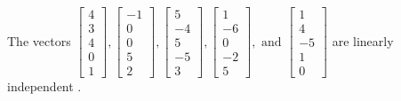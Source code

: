 \begin{exercise}
\begin{exerciseStatement}
  \end{exerciseStatement}
  \begin{exerciseAnswer}
   The vectors \(\left[\begin{array}{r}
4 \\
3 \\
4 \\
0 \\
1
\end{array}\right] , \left[\begin{array}{r}
-1 \\
0 \\
0 \\
5 \\
2
\end{array}\right] , \left[\begin{array}{r}
5 \\
-4 \\
5 \\
-5 \\
3
\end{array}\right] , \left[\begin{array}{r}
1 \\
-6 \\
0 \\
-2 \\
5
\end{array}\right] , \text{ and } \left[\begin{array}{r}
1 \\
4 \\
-5 \\
1 \\
0
\end{array}\right]\) are 
  	 linearly independent  .
  


  \end{exerciseAnswer}
\end{exercise}